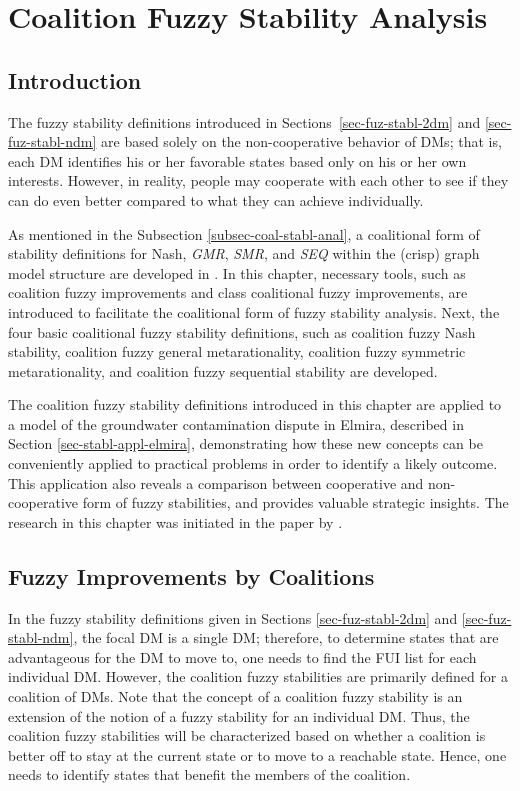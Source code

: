 \chapter{Coalition Fuzzy Stability Analysis}\label{chap-cfsa}

\section{Introduction}

The fuzzy stability definitions introduced in Sections~\ref{sec-fuz-stabl-2dm} and \ref{sec-fuz-stabl-ndm} are based solely on the non-cooperative behavior of DMs; that is, each DM identifies his or her favorable states based only on his or her own interests. However, in reality, people may cooperate with each other to see if they can do even better compared to what they can achieve individually.

As mentioned in the Subsection \ref{subsec-coal-stabl-anal}, a coalitional form of stability definitions for Nash, \emph{GMR}, \emph{SMR}, and \emph{SEQ} within the (crisp) graph model structure are developed in \citep{Kilgour-et-al2001, Inohara&Hipel2008a, Inohara&Hipel2008b}. In this chapter, necessary tools, such as coalition fuzzy improvements and class coalitional fuzzy improvements, are introduced to facilitate the coalitional form of fuzzy stability analysis. Next, the four basic coalitional fuzzy stability definitions, such as coalition fuzzy Nash stability, coalition fuzzy general metarationality, coalition fuzzy symmetric metarationality, and coalition fuzzy sequential stability are developed.

The coalition fuzzy stability definitions introduced in this chapter are applied to a model of the groundwater contamination dispute in Elmira, described in Section \ref{sec-stabl-appl-elmira}, demonstrating how these new concepts can be conveniently applied to practical problems in order to identify a likely outcome. This application also reveals a comparison between cooperative and non-cooperative form of fuzzy stabilities, and provides valuable strategic insights. The research in this chapter was initiated in the paper by \citet{Bashar-et-al2012a}.

\section{Fuzzy Improvements by Coalitions}\label{sec-fi-coals}

In the fuzzy stability definitions given in Sections \ref{sec-fuz-stabl-2dm} and \ref{sec-fuz-stabl-ndm}, the focal DM is a single DM; therefore, to determine states that are advantageous for the DM to move to, one needs to find the FUI list for each individual DM. However, the coalition fuzzy stabilities are primarily defined for a coalition of DMs. Note that the concept of a coalition fuzzy stability is an extension of the notion of a fuzzy stability for an individual DM. Thus, the coalition fuzzy stabilities will be characterized based on whether a coalition is better off to stay at the current state or to move to a reachable state. Hence, one needs to identify states that benefit the members of the coalition.

